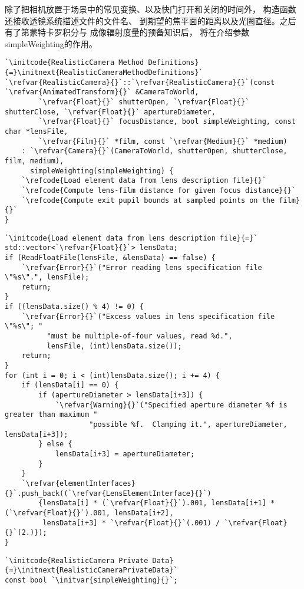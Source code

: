 除了把相机放置于场景中的常见变换、以及快门打开和关闭的时间外，
构造函数还接收透镜系统描述文件的文件名、
到期望的焦平面的距离以及光圈直径。之后有了第蒙特卡罗积分与
成像辐射度量的预备知识后，
将在介绍参数{\ttfamily simpleWeighting}的作用。
\begin{lstlisting}
`\initcode{RealisticCamera Method Definitions}{=}\initnext{RealisticCameraMethodDefinitions}`
`\refvar{RealisticCamera}{}`::`\refvar{RealisticCamera}{}`(const `\refvar{AnimatedTransform}{}` &CameraToWorld,
        `\refvar{Float}{}` shutterOpen, `\refvar{Float}{}` shutterClose, `\refvar{Float}{}` apertureDiameter,
        `\refvar{Float}{}` focusDistance, bool simpleWeighting, const char *lensFile,
        `\refvar{Film}{}` *film, const `\refvar{Medium}{}` *medium)
    : `\refvar{Camera}{}`(CameraToWorld, shutterOpen, shutterClose, film, medium),
      simpleWeighting(simpleWeighting) {
    `\refcode{Load element data from lens description file}{}`
    `\refcode{Compute lens-film distance for given focus distance}{}`
    `\refcode{Compute exit pupil bounds at sampled points on the film}{}`
}
\end{lstlisting}
\begin{lstlisting}
`\initcode{Load element data from lens description file}{=}`
std::vector<`\refvar{Float}{}`> lensData;
if (ReadFloatFile(lensFile, &lensData) == false) {
    `\refvar{Error}{}`("Error reading lens specification file \"%s\".", lensFile);
    return;
}
if ((lensData.size() % 4) != 0) {
    `\refvar{Error}{}`("Excess values in lens specification file \"%s\"; "
          "must be multiple-of-four values, read %d.",
          lensFile, (int)lensData.size());
    return;
}
for (int i = 0; i < (int)lensData.size(); i += 4) {
    if (lensData[i] == 0) {
        if (apertureDiameter > lensData[i+3]) {
            `\refvar{Warning}{}`("Specified aperture diameter %f is greater than maximum "
                    "possible %f.  Clamping it.", apertureDiameter, lensData[i+3]);
        } else {
            lensData[i+3] = apertureDiameter;
        }
    }
    `\refvar{elementInterfaces}{}`.push_back((`\refvar{LensElementInterface}{}`)
        {lensData[i] * (`\refvar{Float}{}`).001, lensData[i+1] * (`\refvar{Float}{}`).001, lensData[i+2],
         lensData[i+3] * `\refvar{Float}{}`(.001) / `\refvar{Float}{}`(2.)});
}
\end{lstlisting}
\begin{lstlisting}
`\initcode{RealisticCamera Private Data}{=}\initnext{RealisticCameraPrivateData}`
const bool `\initvar{simpleWeighting}{}`;
\end{lstlisting}

